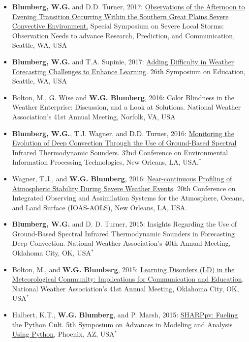 \documentclass[10pt]{res} %
\begin{document}
\begin{resume}
\begin{itemize}
\item \textbf{Blumberg, W.G.} and D.D. Turner, 2017: \href{https://ams.confex.com/ams/97Annual/webprogram/Paper313841.html}{Observations of the Afternoon to Evening Transition Occurring Within the Southern Great Plains Severe Convective Environment.} Special Symposium on Severe Local Storms: Observation Needs to advance Research, Prediction, and Communication, Seattle, WA, USA
\item \textbf{Blumberg, W.G.} and T.A. Supinie, 2017: \href{https://ams.confex.com/ams/97Annual/webprogram/Paper315011.html}{Adding Difficulty in Weather Forecasting Challenges to Enhance Learning}. 26th Symposium on Education, Seattle, WA, USA
\item Bolton, M., G. Wise and \textbf{W.G. Blumberg}, 2016: Color Blindness in the Weather Enterprise: Discussion, and a Look at Solutions. National Weather Association's 41st Annual Meeting, Norfolk, VA, USA
\item \textbf{Blumberg, W.G.}, T.J. Wagner, and D.D. Turner, 2016: \href{https://ams.confex.com/ams/96Annual/webprogram/Paper284726.html}{Monitoring the Evolution of Deep Convection Through the Use of Ground-Based Spectral Infrared Thermodynamic Sounders}. 32nd Conference on Environmental Information Processing Technologies, New Orleans, LA, USA.$^{*}$
\item Wagner, T.J., and \textbf{W.G. Blumberg}, 2016: \href{https://ams.confex.com/ams/96Annual/webprogram/Paper289298.html}{Near-continuous Profiling of Atmospheric Stability During Severe Weather Events}.  20th Conference on Integrated Observing and Assimilation Systems for the Atmosphere, Oceans, and Land Surface (IOAS-AOLS), New Orleans, LA, USA.
\item \textbf{Blumberg, W.G.} and D. D. Turner, 2015: Insights Regarding the Use of Ground-Based Spectral Infrared Thermodynamic Sounders in Forecasting Deep Convection. National Weather Association's 40th Annual Meeting, Oklahoma City, OK, USA\textbf{$^{*}$}
\item Bolton, M., and \textbf{W.G. Blumberg}, 2015: \href{http://slideplayer.com/slide/9176419/}{Learning Disorders (LD) in the Meteorological Community: Implications for Communication and Education}. National Weather Association's 41st Annual Meeting, Oklahoma City, OK, USA$^{*}$
\item Halbert, K.T., \textbf{W.G. Blumberg}, and P. Marsh, 2015: \href{https://ams.confex.com/ams/95Annual/webprogram/Paper270233.html}{SHARPpy: Fueling the Python Cult. 5th Symposium on Advances in Modeling and Analysis Using Python}, Phoenix, AZ, USA$^{*}$

\end{itemize}
\end{resume}
\end{document}
